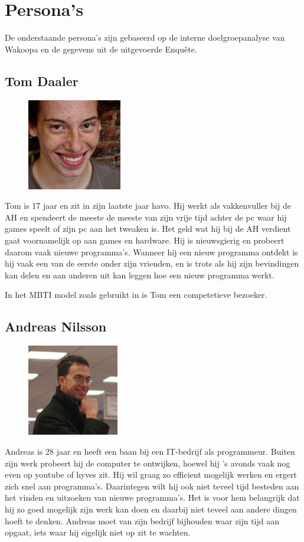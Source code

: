 \chapter{Persona's}
    \label{personasappendix}
De onderstaande persona's zijn gebaseerd op de interne doelgroepanalyse van Wakoopa en de gegevens uit de uitgevoerde Enqu\^ete.

\section{Tom Daaler}
  \begin{figure}
      \includegraphics[height=40mm]{../images/personas/tom}
  \end{figure}
Tom is 17 jaar en zit in zijn laatste jaar havo. Hij werkt als vakkenvuller bij de AH en spendeert de meeste de meeste van zijn vrije tijd achter de pc waar hij games speelt of zijn pc aan het tweaken is. Het geld wat hij bij de AH verdient gaat voornamelijk op aan games en hardware. Hij is nieuwsgierig en probeert daarom vaak nieuwe programma's. Wanneer hij een nieuw programma ontdekt is hij vaak een van de eerste onder zijn vrienden, en is trots als hij zijn bevindingen kan delen en aan anderen uit kan leggen hoe een nieuw programma werkt.

In het MBTI model zoals gebruikt in \cite{Klompsma} is Tom een competetieve bezoeker.

\section{Andreas Nilsson}
  \begin{figure}
      \includegraphics[height=40mm]{../images/personas/andreas}
  \end{figure}
Andreas is 28 jaar en heeft een baan bij een IT-bedrijf als programmeur. Buiten zijn werk probeert hij de computer te ontwijken, hoewel hij 's avonds vaak nog even op youtube of hyves zit. Hij wil graag zo efficient mogelijk werken en ergert zich snel aan programma's. Daarintegen wilt hij ook niet teveel tijd besteden aan het vinden en uitzoeken van nieuwe programma's. Het is voor hem belangrijk dat hij zo goed mogelijk zijn werk kan doen en daarbij niet teveel aan andere dingen hoeft te denken. Andreas moet van zijn bedrijf bijhouden waar zijn tijd aan opgaat, iets waar hij eigelijk niet op zit te wachten.


